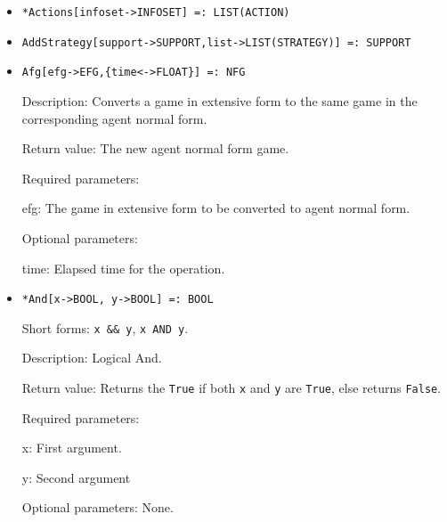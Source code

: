 \begin{itemize}


\item
\protect \large \begin{verbatim} 
*Actions[infoset->INFOSET] =: LIST(ACTION)
\end{verbatim}\normalsize

\item
\protect \large \begin{verbatim}
AddStrategy[support->SUPPORT,list->LIST(STRATEGY)] =: SUPPORT
\end{verbatim}\normalsize

\item
\protect \large \begin{verbatim}
Afg[efg->EFG,{time<->FLOAT}] =: NFG
\end{verbatim}\normalsize

\bd
\item
[Description:] Converts a game in extensive form to the same
game in the corresponding agent normal form.
\item
[Return value:] The new agent normal form game.
\item 
[Required parameters:]\hfil\null

\bd
\item
[efg:] The game in extensive form to be converted to agent normal
form.
\ed

\item
[Optional parameters:]\hfil\null
	
\bd
\item
[time:] Elapsed time for the operation.
\ed
\ed

\item 
\protect \large \begin{verbatim}
*And[x->BOOL, y->BOOL] =: BOOL
\end{verbatim} \normalsize
\bd
\item
[Short forms:] \verb+x && y+, \verb+x AND y+.
\item
[Description:] Logical And.
\item
[Return value:] Returns the \verb+True+ if both \verb+x+ and \verb+y+ are
\verb+True+, else returns \verb+False+.  
\item
[Required parameters:]\hfil\null
\bd
\item
[x:] First argument.  
\item
[y:] Second argument
\ed
\item
[Optional parameters:] None.
\ed



\end{itemize}
